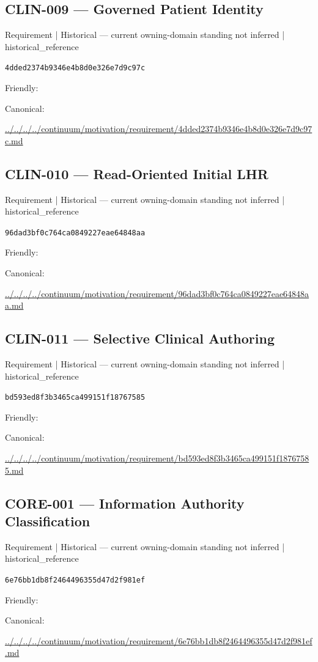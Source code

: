 \documentclass[10pt,a4paper]{article}
\begin{document}
\subsection*{CLIN-009 — Governed Patient Identity}
{\small Requirement | Historical — current owning-domain standing not inferred | historical\_reference}\par
\texttt{4dded2374b9346e4b8d0e326e7d9c97c}\par
Friendly: \par
Canonical: \par
{\footnotesize\url{../../../../continuum/motivation/requirement/4dded2374b9346e4b8d0e326e7d9c97c.md}}\par
\subsection*{CLIN-010 — Read-Oriented Initial LHR}
{\small Requirement | Historical — current owning-domain standing not inferred | historical\_reference}\par
\texttt{96dad3bf0c764ca0849227eae64848aa}\par
Friendly: \par
Canonical: \par
{\footnotesize\url{../../../../continuum/motivation/requirement/96dad3bf0c764ca0849227eae64848aa.md}}\par
\subsection*{CLIN-011 — Selective Clinical Authoring}
{\small Requirement | Historical — current owning-domain standing not inferred | historical\_reference}\par
\texttt{bd593ed8f3b3465ca499151f18767585}\par
Friendly: \par
Canonical: \par
{\footnotesize\url{../../../../continuum/motivation/requirement/bd593ed8f3b3465ca499151f18767585.md}}\par
\subsection*{CORE-001 — Information Authority Classification}
{\small Requirement | Historical — current owning-domain standing not inferred | historical\_reference}\par
\texttt{6e76bb1db8f2464496355d47d2f981ef}\par
Friendly: \par
Canonical: \par
{\footnotesize\url{../../../../continuum/motivation/requirement/6e76bb1db8f2464496355d47d2f981ef.md}}\par
\end{document}
